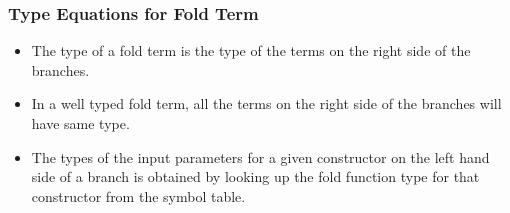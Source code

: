 \documentclass[11pt]{article}
\begin{document}
\subsubsection {Type Equations for Fold Term}
\begin{itemize}
  \item The type of a {\sf fold} term is the type of the terms on the right side of the branches.
  \item In a well typed {\sf fold} term, all the terms on the right side of the branches will have same type.
  \item The types of the input parameters for a given constructor on the left hand side of a branch is obtained by looking up the fold function type for that constructor from the symbol table.
\end{itemize}
~~\\~~\\
\end{document}
